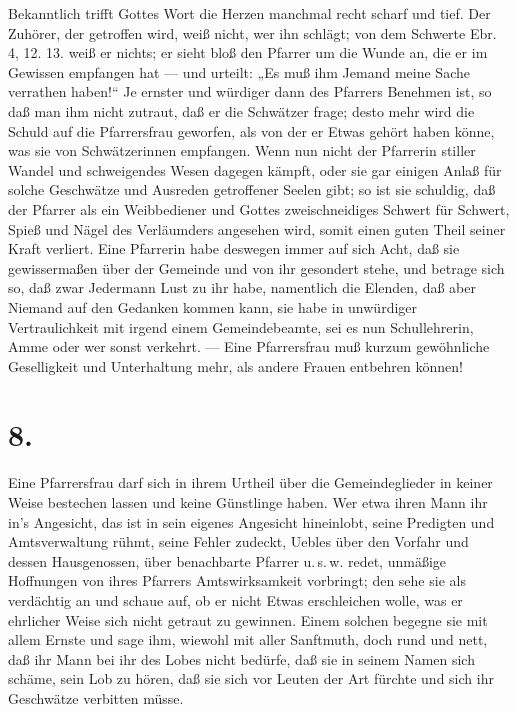 Bekanntlich trifft Gottes Wort die Herzen manchmal recht scharf und tief. Der Zuhörer, der getroffen wird, weiß nicht, wer ihn schlägt; von dem Schwerte Ebr. 4, 12. 13. weiß er nichts; er sieht bloß den Pfarrer um die Wunde an, die er im Gewissen empfangen hat — und urteilt: „Es muß ihm Jemand meine Sache verrathen haben!“ Je ernster und würdiger dann des Pfarrers Benehmen ist, so daß man ihm nicht zutraut, daß er die Schwätzer frage; desto mehr wird die Schuld auf die Pfarrersfrau geworfen, als von der er Etwas gehört haben könne, was sie von Schwätzerinnen empfangen. Wenn nun nicht der Pfarrerin stiller Wandel und schweigendes Wesen dagegen kämpft, oder sie gar einigen Anlaß für solche Geschwätze und Ausreden getroffener Seelen gibt; so ist sie schuldig, daß der Pfarrer als ein Weibbediener und Gottes zweischneidiges
Schwert für Schwert, Spieß und Nägel des Verläumders angesehen wird, somit einen guten Theil seiner Kraft verliert. Eine Pfarrerin habe deswegen immer auf sich Acht, daß sie gewissermaßen über der Gemeinde und von ihr gesondert stehe, und betrage sich so, daß zwar Jedermann Lust zu ihr habe, namentlich die Elenden, daß aber Niemand auf den Gedanken kommen kann, sie habe in unwürdiger Vertraulichkeit mit irgend einem Gemeindebeamte, sei es nun Schullehrerin, Amme oder wer sonst verkehrt. — Eine Pfarrersfrau muß kurzum gewöhnliche Geselligkeit und Unterhaltung mehr, als andere Frauen entbehren können!

\section{8.}

Eine Pfarrersfrau darf sich in ihrem Urtheil über die Gemeindeglieder in keiner Weise bestechen lassen und keine Günstlinge haben. Wer etwa ihren Mann ihr in’s Angesicht, das ist in sein eigenes Angesicht hineinlobt, seine Predigten und Amtsverwaltung rühmt, seine Fehler zudeckt, Uebles über den Vorfahr und dessen Hausgenossen, über benachbarte Pfarrer u.\,s.\,w. redet, unmäßige Hoffnungen von ihres Pfarrers Amtswirksamkeit vorbringt; den sehe sie als verdächtig an und schaue auf, ob er nicht Etwas erschleichen wolle, was er ehrlicher Weise sich nicht getraut zu gewinnen. Einem solchen begegne sie mit allem Ernste und sage ihm, wiewohl mit aller Sanftmuth, doch rund und nett, daß ihr Mann bei ihr des Lobes nicht bedürfe, daß sie in seinem Namen sich schäme, sein Lob zu hören, daß sie sich vor Leuten der Art fürchte und sich ihr Geschwätze verbitten müsse.

